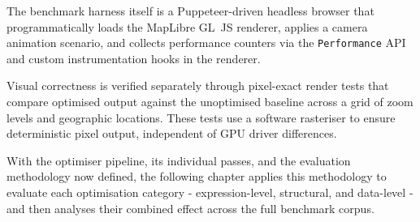 The benchmark harness itself is a Puppeteer-driven headless browser that programmatically loads the MapLibre GL~JS renderer, applies a camera animation scenario, and collects performance counters via the \texttt{Performance} API and custom instrumentation hooks in the renderer.

Visual correctness is verified separately through pixel-exact render tests that compare optimised output against the unoptimised baseline across a grid of zoom levels and geographic locations.
These tests use a software rasteriser to ensure deterministic pixel output, independent of GPU driver differences.

With the optimiser pipeline, its individual passes, and the evaluation methodology now defined, the following chapter applies this methodology to evaluate each optimisation category - expression-level, structural, and data-level - and then analyses their combined effect across the full benchmark corpus.
